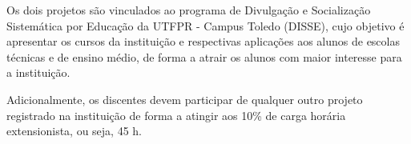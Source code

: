 Os dois projetos são vinculados ao programa de Divulgação e Socialização Sistemática por Educação da UTFPR - Campus Toledo (DISSE), cujo objetivo é apresentar os cursos da instituição e respectivas aplicações aos alunos de escolas técnicas e de ensino médio, de forma a atrair os alunos com maior interesse para a instituição.


Adicionalmente, os discentes devem participar de qualquer outro projeto registrado na instituição de forma a atingir aos 10\% de carga horária extensionista, ou seja, 45 h. 